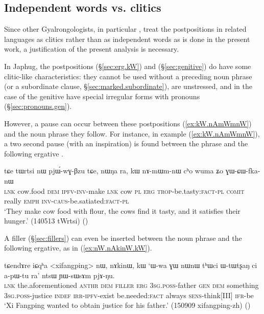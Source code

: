 \subsection{Independent words vs. clitics}  \label{ex:word.vs.clitic.postp}  
Since other Gyalrongologists, in particular \citet{jackson98morphology, jackson14morpho}, treat the postpositions in related languages as clitics rather than as independent words as is done in the present work, a justification of the present analysis is necessary.

In Japhug, the postpositions  (§\ref{sec:erg.kW}) and   (§\ref{sec:genitive}) do have some clitic-like characteristics: they cannot be used without a preceding noun phrase (or a subordinate clause, §\ref{sec:marked.subordinate}), are unstressed, and in the case of the genitive have special irregular forms with pronouns (§\ref{sec:pronouns.gen}).

However, a pause can occur between these postpositions (\ref{ex:kW.nAmWmnW}) and the noun phrase they follow. For instance, in example (\ref{ex:kW.nAmWmnW}), a two second pause (with an inspiration) is found between the phrase  and the following ergative . 

\begin{exe}
\ex \label{ex:kW.nAmWmnW}
\gll tɕe tɯrtsi nɯ pjɯ́-wɣ-βzu tɕe, nɯŋa ra, kɯ nɤ-mɯm-nɯ cʰo wuma ʑo ɣɯ-ɕɯ-fka-nɯ \\
\textsc{lnk} cow.food \textsc{dem} \textsc{ipfv}-\textsc{inv}-make \textsc{lnk} cow \textsc{pl} \textsc{erg} \textsc{trop}-be.tasty:\textsc{fact}-\textsc{pl} \textsc{comit} really \textsc{emph} \textsc{inv}-\textsc{caus}-be.satiated:\textsc{fact}-\textsc{pl} \\
\glt `They make cow food with flour, the cows find it tasty, and it satisfies their hunger.' (140513 tWrtsi)
()
\end{exe}

A filler (§\ref{sec:fillers}) can even be inserted between the noun phrase and the following ergative, as in (\ref{ex:nW.nAkinW.kW}).

\begin{exe}
\ex \label{ex:nW.nAkinW.kW}
\gll  tɕendɤre iɕqʰa <xifangping> nɯ, nɤkinɯ, kɯ `ɯ-wa ɣɯ nɯnɯ tʰɯci ɯ-tɯtʂaŋ ci a-pɯ-tu ra' ntsɯ ɲɯ-sɯsɤm pjɤ-ŋu. \\
\textsc{lnk} the.aforementioned  \textsc{anthr} \textsc{dem} \textsc{filler} \textsc{erg} \textsc{3sg}.\textsc{poss}-father \textsc{gen} \textsc{dem} something \textsc{3sg}.\textsc{poss}-justice \textsc{indef} \textsc{irr}-\textsc{ipfv}-exist be.needed:\textsc{fact} always \textsc{sens}-think[III] \textsc{ifr}-be \\
\glt `Xi Fangping wanted to obtain justice for his father.' (150909 xifangping-zh)
()
\end{exe}

